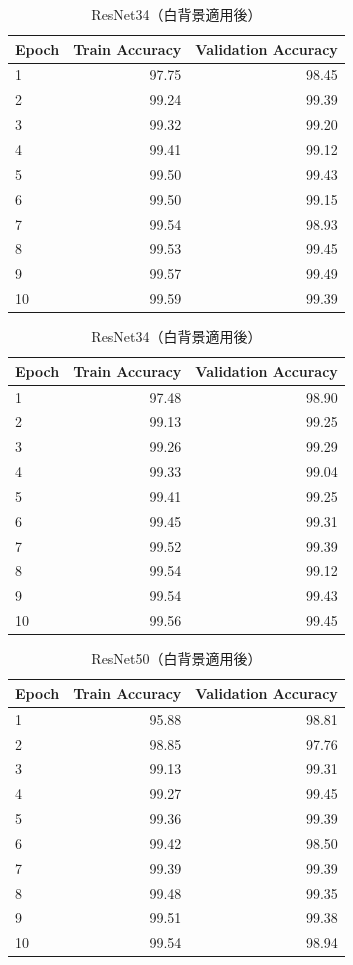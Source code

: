 \documentclass[a4paper,11pt,titlepage]{jsarticle}
\begin{document}
\begin{table}[H]
\begin{minipage}{0.49\hsize}
\centering
\caption{ResNet18（白背景適用後）}
\label{tab:Resnet18_white}
\begin{tabular}{lrr}
\hline
Epoch & Train Accuracy & Validation Accuracy \\
\hline
1 & 97.75 & 98.45 \\
2 & 99.24 & 99.39 \\
3 & 99.32 & 99.20 \\
4 & 99.41 & 99.12 \\
5 & 99.50 & 99.43 \\
6 & 99.50 & 99.15 \\
7 & 99.54 & 98.93 \\
8 & 99.53 & 99.45 \\
9 & 99.57 & 99.49 \\
10 & 99.59 & 99.39 \\
\hline
\end{tabular}
\end{minipage}
\hfill
\begin{minipage}{0.49\hsize}
\centering
\caption{ResNet34（白背景適用後）}
\label{tab:Resnet34_white}
\begin{tabular}{lrr}
\hline
Epoch & Train Accuracy & Validation Accuracy \\
\hline
1 & 97.48 & 98.90 \\
2 & 99.13 & 99.25 \\
3 & 99.26 & 99.29 \\
4 & 99.33 & 99.04 \\
5 & 99.41 & 99.25 \\
6 & 99.45 & 99.31 \\
7 & 99.52 & 99.39 \\
8 & 99.54 & 99.12 \\
9 & 99.54 & 99.43 \\
10 & 99.56 & 99.45 \\
\hline
\end{tabular}
\end{minipage}
\end{table}

\begin{table}[H]
\centering
\caption{ResNet50（白背景適用後）}
\label{tab:Resnet50_white}
\begin{tabular}{lrr}
\hline
Epoch & Train Accuracy & Validation Accuracy \\
\hline
1 & 95.88 & 98.81 \\
2 & 98.85 & 97.76 \\
3 & 99.13 & 99.31 \\
4 & 99.27 & 99.45 \\
5 & 99.36 & 99.39 \\
6 & 99.42 & 98.50 \\
7 & 99.39 & 99.39 \\
8 & 99.48 & 99.35 \\
9 & 99.51 & 99.38 \\
10 & 99.54 & 98.94 \\
\hline
\end{tabular}
\end{table}
\end{document}

